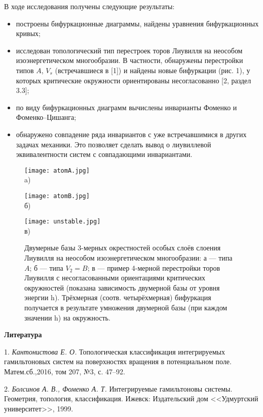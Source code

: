 В ходе исследования получены следующие результаты:
\begin{itemize}
	\item построены бифуркационные диаграммы, найдены уравнения бифуркационных кривых;
	\item исследован топологический тип перестроек торов Лиувилля на неособом изоэнергетическом многообразии. В частности, обнаружены перестройки типов $A$, $V_s$ (встречавшиеся в [1]) и найдены новые бифуркации (рис. 1), у которых критические окружности ориентированы несогласованно [2, раздел 3.3];
	\item по виду бифуркационных диаграмм вычислены инварианты Фоменко и Фоменко--Цишанга;
	\item обнаружено совпадение ряда инвариантов с уже встречавшимися в других задачах механики. Это позволяет сделать вывод о лиувиллевой эквивалентности систем с совпадающими инвариантами.
\end{itemize}
\begin{figure}
\begin{minipage}{0.33\linewidth}
\begin{center}
\texttt{[image: atomA.jpg]} \\ a)
\end{center}
\end{minipage}
\hfill
\begin{minipage}{0.33\linewidth}
\begin{center}
\texttt{[image: atomB.jpg]} \\ б)
\end{center}
\end{minipage}
\hfill
\begin{minipage}{0.98\linewidth}
\begin{center}
\texttt{[image: unstable.jpg]} \\ в)
\end{center}
\end{minipage}
\caption{\small{Двумерные базы 3-мерных окрестностей особых слоёв слоения Лиувилля на неособом изоэнергетическом многообразии: а --- типа $A$; б --- типа $V_2=B$; в --- пример 4-мерной перестройки торов Лиувилля с несогласованными ориентациями критических окружностей (показана зависимость двумерной базы от уровня энергии h). Трёхмерная (соотв. четырёхмерная) бифуркация получается в результате умножения двумерной базы (при каждом значении h) на окружность.}}
\end{figure}

\smallskip \centerline {\bf Литература} \nopagebreak

1. {\it Кантонистова Е. О.} Топологическая классификация интегрируемых гамильтоновых систем на поверхностях вращения в потенциальном поле.
Матем.сб.,2016, том 207, №3, с. 47--92.

2. {\it Болсинов А. В., Фоменко А. Т.} Интегрируемые гамильтоновы системы. Геометрия, топология, классификация. Ижевск: Издательский дом <<Удмуртский университет>>, 1999.

% 